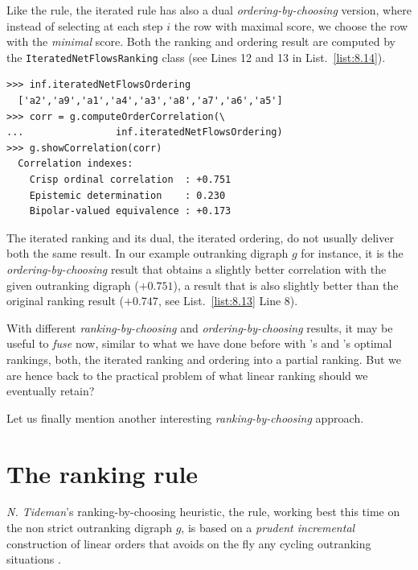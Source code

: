 Like the \Kohler rule, the iterated \NetFlows rule has also a dual \emph{ordering-by-choosing} version, where instead of selecting at each step $i$ the row with maximal \NetFlows score, we choose the row with the \emph{minimal} \NetFlows score. Both the ranking and ordering result are computed by the \texttt{IteratedNetFlowsRanking} class (see Lines 12 and 13 in List.~\vref{list:8.14}).
\begin{lstlisting}
>>> inf.iteratedNetFlowsOrdering
  ['a2','a9','a1','a4','a3','a8','a7','a6','a5']
>>> corr = g.computeOrderCorrelation(\
...                inf.iteratedNetFlowsOrdering)
>>> g.showCorrelation(corr)
  Correlation indexes:
    Crisp ordinal correlation  : +0.751
    Epistemic determination    : 0.230
    Bipolar-valued equivalence : +0.173
\end{lstlisting}

The iterated \NetFlows ranking and its dual, the iterated \NetFlows ordering, do not usually deliver both the same result. In our example outranking digraph $g$ for instance, it is the \emph{ordering-by-choosing} result that obtains a slightly better correlation with the given outranking digraph ($+0.751$), a result that is also slightly better than the original \Kohler ranking result ($+0.747$, see List.~\vref{list:8.13} Line 8).

With different \emph{ranking-by-choosing} and \emph{ordering-by-choosing} results, it may be useful to \emph{fuse} now, similar to what we have done before with \Kemeny 's and \Slater 's optimal rankings, both, the iterated \NetFlows ranking and ordering into a partial ranking. But we are hence back to the practical problem of what linear ranking should we eventually retain? 

Let us finally mention another interesting \emph{ranking-by-choosing} approach.

\section{The \RankedPairs ranking rule}
\label{sec:8.7}

\emph{N. Tideman}'s  ranking-by-choosing heuristic, the \RankedPairs rule, working best this time on the non strict outranking digraph $g$, is based on a \emph{prudent incremental} construction of linear orders that avoids on the fly any cycling outranking situations \citep{TID-1987}.

